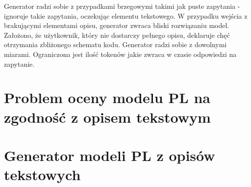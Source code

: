 Generator radzi sobie z przypadkami brzegowymi takimi jak puste zapytania - ignoruje takie zapytania, oczekując elementu tekstowego. W przypadku wejścia z brakującymi elementami opisu, generator zwraca bliski rozwiązaniu model. Założono, że użytkownik, który nie dostarczy pełnego opisu, deklaruje chęć otrzymania zbliżonego schematu kodu. Generator radzi sobie z dowolnymi miarami. Ograniczona jest ilość tokenów jakie zwraca w czasie odpowiedzi na zapytanie.

\section{Problem oceny modelu PL na zgodność z opisem tekstowym}







\section{Generator modeli PL z opisów tekstowych}


